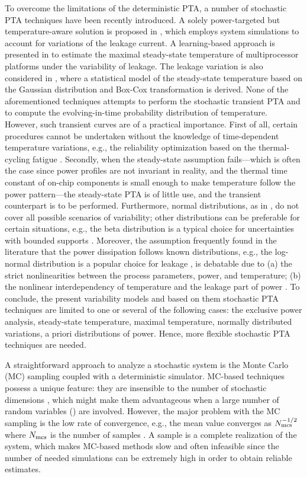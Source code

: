 To overcome the limitations of the deterministic PTA, a number of stochastic PTA techniques have been recently introduced. A solely power-targeted but temperature-aware solution is proposed in \cite{chandra2010}, which employs system simulations to account for variations of the leakage current. A learning-based approach is presented in \cite{juan2011} to estimate the maximal steady-state temperature of multiprocessor platforms under the variability of leakage. The leakage variation is also considered in \cite{juan2012}, where a statistical model of the steady-state temperature based on the Gaussian distribution and Box-Cox transformation is derived. None of the aforementioned techniques attempts to perform the stochastic transient PTA and to compute the evolving-in-time probability distribution of temperature. However, such transient curves are of a practical importance. First of all, certain procedures cannot be undertaken without the knowledge of time-dependent temperature variations, e.g., the reliability optimization based on the thermal-cycling fatigue \cite{ukhov2012}. Secondly, when the steady-state assumption fails---which is often the case since power profiles are not invariant in reality, and the thermal time constant of on-chip components is small enough to make temperature follow the power pattern---the steady-state PTA is of little use, and the transient counterpart is to be performed. Furthermore, normal distributions, as in \cite{juan2012}, do not cover all possible scenarios of variability; other distributions can be preferable for certain situations, e.g., the beta distribution is a typical choice for uncertainties with bounded supports \cite{maitre2010}. Moreover, the assumption frequently found in the literature that the power dissipation follows known distributions, e.g., the log-normal distribution is a popular choice for leakage \cite{srivastava2010}, is debatable due to (a) the strict nonlinearities between the process parameters, power, and temperature; (b) the nonlinear interdependency of temperature and the leakage part of power \cite{liu2007}. To conclude, the present variability models and based on them stochastic PTA techniques are limited to one or several of the following cases: the exclusive power analysis, steady-state temperature, maximal temperature, normally distributed variations, a priori distributions of power. Hence, more flexible stochastic PTA techniques are needed.

A straightforward approach to analyze a stochastic system is the Monte Carlo (MC) sampling coupled with a deterministic simulator. MC-based techniques possess a unique feature: they are insensible to the number of stochastic dimensions \cite{maitre2010}, which might make them advantageous when a large number of random variables (\rvs) are involved. However, the major problem with the MC sampling is the low rate of convergence, e.g., the mean value converges as $N_\text{mcs}^{-{{1}/{2}}}$ where $N_\text{mcs}$ is the number of samples \cite{xiu2010, maitre2010}. A sample is a complete realization of the system, which makes MC-based methods slow and often infeasible since the number of needed simulations can be extremely high in order to obtain reliable estimates.

